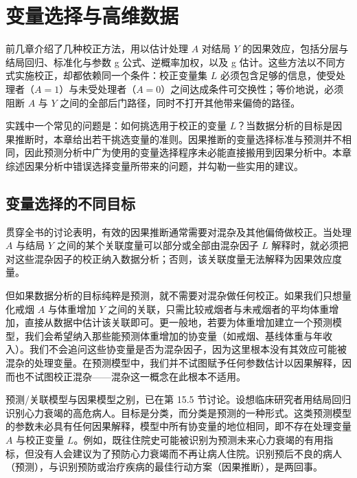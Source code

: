 \chapter{变量选择与高维数据}

前几章介绍了几种校正方法，用以估计处理 $A$ 对结局 $Y$ 的因果效应，包括分层与结局回归、标准化与参数 g 公式、逆概率加权，以及 g 估计。这些方法以不同方式实施校正，却都依赖同一个条件：校正变量集 $L$ 必须包含足够的信息，使受处理者（$A=1$）与未受处理者（$A=0$）之间达成条件可交换性；等价地说，必须阻断 $A$ 与 $Y$ 之间的全部后门路径，同时不打开其他带来偏倚的路径。

实践中一个常见的问题是：如何挑选用于校正的变量 $L$？当数据分析的目标是因果推断时，本章给出若干挑选变量的准则。因果推断的变量选择标准与预测并不相同，因此预测分析中广为使用的变量选择程序未必能直接搬用到因果分析中。本章综述因果分析中错误选择变量所带来的问题，并勾勒一些实用的建议。

\section{变量选择的不同目标}

贯穿全书的讨论表明，有效的因果推断通常需要对混杂及其他偏倚做校正。当处理 $A$ 与结局 $Y$ 之间的某个关联度量可以部分或全部由混杂因子 $L$ 解释时，就必须把对这些混杂因子的校正纳入数据分析；否则，该关联度量无法解释为因果效应度量。

但如果数据分析的目标纯粹是预测，就不需要对混杂做任何校正。如果我们只想量化戒烟 $A$ 与体重增加 $Y$ 之间的关联，只需比较戒烟者与未戒烟者的平均体重增加，直接从数据中估计该关联即可。更一般地，若要为体重增加建立一个预测模型，我们会希望纳入那些能预测体重增加的协变量（如戒烟、基线体重与年收入）。我们不会追问这些协变量是否为混杂因子，因为这里根本没有其效应可能被混杂的处理变量。在预测模型中，我们并不试图赋予任何参数估计以因果解释，因而也不试图校正混杂——混杂这一概念在此根本不适用。

预测/关联模型与因果模型之别，已在第 15.5 节讨论。设想临床研究者用结局回归识别心力衰竭的高危病人。目标是分类，而分类是预测的一种形式。这类预测模型的参数未必具有任何因果解释，模型中所有协变量的地位相同，即不存在处理变量 $A$ 与校正变量 $L$。例如，既往住院史可能被识别为预测未来心力衰竭的有用指标，但没有人会建议为了预防心力衰竭而不再让病人住院。识别预后不良的病人（预测），与识别预防或治疗疾病的最佳行动方案（因果推断），是两回事。

